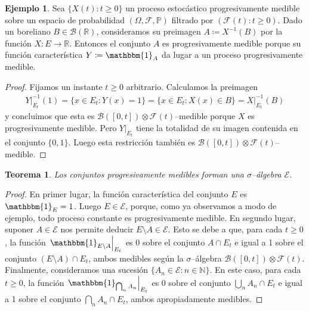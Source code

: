 \documentclass{report}
\newcommand{\restrict}[2]{\left.#1\right|_{#2}}
\newcommand{\characteristic}{\mathbbm{1}}
\newcommand{\prob}{\mathbb{P}}
\newcommand{\events}{\mathcal{F}}
\newcommand{\borel}{\mathscr{B}}
\newcommand{\progressiveAlgebra}{\mathscr{E}}
\newcommand{\naturalNumbers}{\mathbb{N}}
\newcommand{\realNumbers}{\mathbb{R}}
\theoremstyle{plain}
\newtheorem{theorem}{Teorema}
\newtheorem{property}{Propiedad}
\theoremstyle{remark}
\theoremstyle{definition}
\newtheorem{example}{Ejemplo}
\begin{document}
\begin{example}
  \label{example:progressivelyMeasurablePreimage}
  Sea \(\{X(t) : t \geq 0\}\) un proceso estocástico progresivamente medible sobre un espacio de probabilidad \((\Omega, \events, \prob)\) filtrado por \((\events(t) : t \geq 0)\).
  Dado un boreliano \(B \in \borel(\realNumbers)\), consideramos su preimagen \(A \coloneqq X^{- 1}(B)\) por la función \(X : E \rightarrow \realNumbers\).
  Entonces el conjunto \(A\) es progresivamente medible porque su función característica \(Y \coloneqq \characteristic_A\) da lugar a un proceso progresivamente medible.
\end{example}
\begin{proof}
  Fijamos un instante \(t \geq 0\) arbitrario.
  Calculamos la preimagen
  \begin{align}
    \restrict{Y}{E_t}^{- 1} (1)
    =
      \{x \in E_t : Y(x) = 1\}
    =
      \{x \in E_t : X(x) \in B\}
    =
      \restrict{X}{E_t}^{- 1}(B)
  \end{align}
  y concluimos que esta es \(\borel([0, t]) \otimes \events(t)\)--medible porque \(X\) es progresivamente medible.
  Pero \(\restrict{Y}{E_t}\) tiene la totalidad de su imagen contenida en el conjunto \(\{0, 1\}\).
  Luego esta restricción también es \(\borel([0, t]) \otimes \events(t)\)--medible.
\end{proof}


\begin{theorem}
  Los conjuntos progresivamente medibles forman una \(\sigma\)--álgebra \(\progressiveAlgebra\).
\end{theorem}
\begin{proof}
  En primer lugar, la función característica del conjunto \(E\) es \({\characteristic_E = 1}\).
  Luego \(E \in \progressiveAlgebra\), porque, como ya observamos a modo de ejemplo, todo proceso constante es progresivamente medible.
  En segundo lugar, suponer \(A \in \progressiveAlgebra\) nos permite deducir \(E \setminus A \in \progressiveAlgebra\).
  Esto se debe a que, para cada \(t \geq 0\), la función \(\restrict{\characteristic_{E \setminus A}}{E_t}\) es 0 sobre el conjunto \(A \cap E_t\) e igual a 1 sobre el conjunto \((E \setminus A) \cap E_t\), ambos medibles según la \(\sigma\)--álgebra \(\borel([0, t]) \otimes \events(t)\).
  Finalmente, consideramos una sucesión \(\{A_n \in \progressiveAlgebra : n \in \naturalNumbers\}\).
  En este caso, para cada \(t \geq 0\), la función \(\restrict{\characteristic_{\bigcap_n A_n}}{E_t}\)
  es 0 sobre el conjunto \(\bigcup_n A_n \cap E_t\) e igual a 1 sobre el conjunto \(\bigcap_n A_n \cap E_t\), ambos apropiadamente medibles.
\end{proof}
\end{document}
